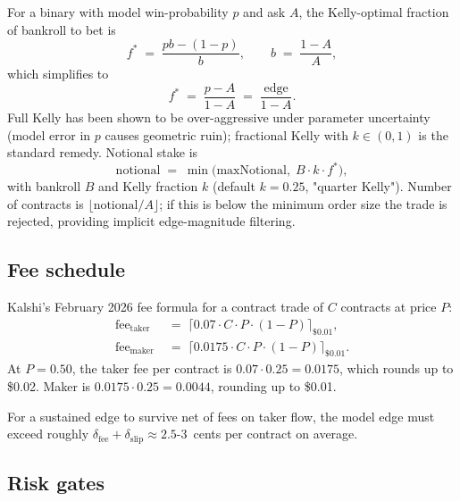 \documentclass[11pt]{article}
\begin{document}
For a binary with model win-probability $p$ and ask $A$, the Kelly-optimal fraction of bankroll to bet is
\begin{equation}
f^{*} \;=\; \frac{pb - (1-p)}{b},\qquad b \;=\; \frac{1-A}{A},
\end{equation}
which simplifies to
\begin{equation}
f^{*} \;=\; \frac{p - A}{1 - A} \;=\; \frac{\text{edge}}{1 - A}.
\label{eq:kelly}
\end{equation}
Full Kelly has been shown to be over-aggressive under parameter uncertainty (model error in $p$ causes geometric ruin); fractional Kelly with $k \in (0, 1)$ is the standard remedy. Notional stake is
\begin{equation}
\text{notional} \;=\; \min\!\Big(\text{maxNotional},\; B\cdot k \cdot f^{*}\Big),
\end{equation}
with bankroll $B$ and Kelly fraction $k$ (default $k = 0.25$, "quarter Kelly"). Number of contracts is $\lfloor\text{notional}/A\rfloor$; if this is below the minimum order size the trade is rejected, providing implicit edge-magnitude filtering.

\subsection{Fee schedule}

Kalshi's February 2026 fee formula for a contract trade of $C$ contracts at price $P$:
\begin{align}
\mathrm{fee}_{\text{taker}} &\;=\; \big\lceil 0.07 \cdot C \cdot P \cdot (1-P) \big\rceil_{\$0.01},\\
\mathrm{fee}_{\text{maker}} &\;=\; \big\lceil 0.0175 \cdot C \cdot P \cdot (1-P) \big\rceil_{\$0.01}.
\end{align}
At $P = 0.50$, the taker fee per contract is $0.07 \cdot 0.25 = 0.0175$, which rounds up to \$0.02. Maker is $0.0175 \cdot 0.25 = 0.0044$, rounding up to \$0.01.

For a sustained edge to survive net of fees on taker flow, the model edge must exceed roughly $\delta_{\text{fee}} + \delta_{\text{slip}} \approx 2.5\text{-}3$~cents per contract on average.

\subsection{Risk gates}
\end{document}
